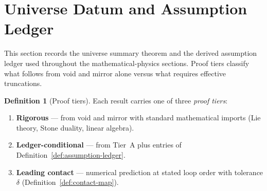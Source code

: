 \documentclass[aps,prd,onecolumn,amsmath,amssymb,nofootinbib,11pt]{revtex4-2}
\numberwithin{equation}{section}
\theoremstyle{plain}
\theoremstyle{definition}
\newtheorem{definition}[theorem]{Definition}
\theoremstyle{remark}
\begin{document}
\section{Universe Datum and Assumption Ledger}
\label{sec:derivation-complete}

This section records the universe summary theorem and the derived assumption
ledger used throughout the mathematical-physics sections. Proof tiers classify
what follows from void and mirror alone versus what requires effective
truncations.

\begin{definition}[Proof tiers]\label{def:proof-tiers}
Each result carries one of three \emph{proof tiers}:
\begin{enumerate}[label=\textbf{Tier~\Alph* :},leftmargin=*]
  \item \textbf{Rigorous} --- from void and mirror with standard mathematical
    imports (Lie theory, Stone duality, linear algebra).
  \item \textbf{Ledger-conditional} --- from Tier~A plus entries of
    Definition~\ref{def:assumption-ledger}.
  \item \textbf{Leading contact} --- numerical prediction at stated loop order
    with tolerance $\delta$ (Definition~\ref{def:contact-map}).
\end{enumerate}
\end{definition}
\end{document}

